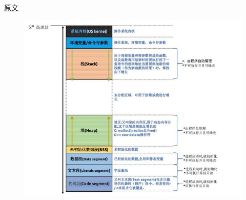 \subsection{\color{purple}{内存布局}}
\href{https://zhuanlan.zhihu.com/p/184957568}{原文}
\begin{figure}[htbp]
	\centering
	\includegraphics[scale=0.7]{tex_include/pic_include/cpp_basic_memo.jpg}
\end{figure}

\subsection{\color{purple}{内存分配}}
